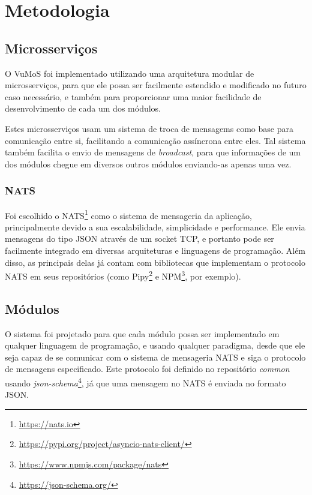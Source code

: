 \chapter{Metodologia}
\label{cap:metodologia}

\section{Microsserviços}

    O VuMoS foi implementado utilizando uma arquitetura modular de microsserviços, para que ele possa ser facilmente estendido e modificado no futuro caso necessário, e também para proporcionar uma maior facilidade de desenvolvimento de cada um dos módulos.
    
    Estes microsserviços usam um sistema de troca de mensagems como base para comunicação entre si, facilitando a comunicação assíncrona entre eles. Tal sistema também facilita o envio de mensagens de \textit{broadcast}, para que informações de um dos módulos chegue em diversos outros módulos enviando-as apenas uma vez. 
    
    
    \subsection{NATS}
    
    Foi escolhido o NATS\footnote{\url{https://nats.io}} como o sistema de mensageria da aplicação, principalmente devido a sua escalabilidade, simplicidade e performance. Ele envia mensagens do tipo JSON através de um socket TCP, e portanto pode ser facilmente integrado em diversas arquiteturas e linguagens de programação. Além disso, as principais delas já contam com bibliotecas que implementam o protocolo NATS em seus repositórios (como Pipy\footnote{\url{https://pypi.org/project/asyncio-nats-client/}} e NPM\footnote{\url{https://www.npmjs.com/package/nats}}, por exemplo).
    
    
\section{Módulos}
    
    O sistema foi projetado para que cada módulo possa ser implementado em qualquer linguagem de programação, e usando qualquer paradigma, desde que ele seja capaz de se comunicar com o sistema de mensageria NATS e siga o protocolo de mensagens especificado. Este protocolo foi definido no repositório \textit{common} usando \textit{json-schema}\footnote{\url{https://json-schema.org/}}, já que uma mensagem no NATS é enviada no formato JSON. 
    
